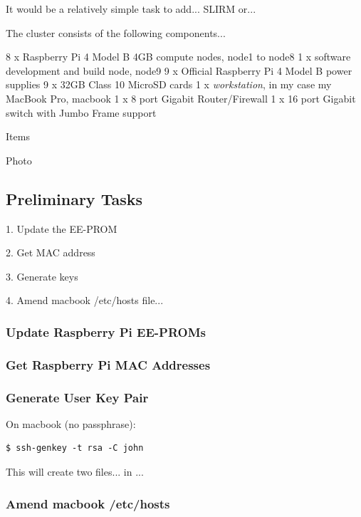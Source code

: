 \documentclass{article}
\begin{document}
It would be a relatively simple task to add... SLIRM or...

The cluster consists of the following components...

8 x Raspberry Pi 4 Model B 4GB compute nodes, node1 to node8
1 x software development and build node, node9
9 x Official Raspberry Pi 4 Model B power supplies
9 x 32GB Class 10 MicroSD cards
1 x \emph{workstation}, in my case my MacBook Pro, macbook
1 x 8 port Gigabit Router/Firewall
1 x 16 port Gigabit switch with Jumbo Frame support

Items

Photo


\subsection{Preliminary Tasks}

1. Update the EE-PROM

2. Get MAC address

3. Generate keys

4. Amend macbook /etc/hosts file...



\subsubsection{Update Raspberry Pi EE-PROMs}



\subsubsection{Get Raspberry Pi MAC Addresses}



\subsubsection{Generate User Key Pair}

On macbook (no passphrase):

\begin{lstlisting}[]
$ ssh-genkey -t rsa -C john
\end{lstlisting}

This will create two files... in ...



\subsubsection{Amend macbook /etc/hosts}
\end{document}
